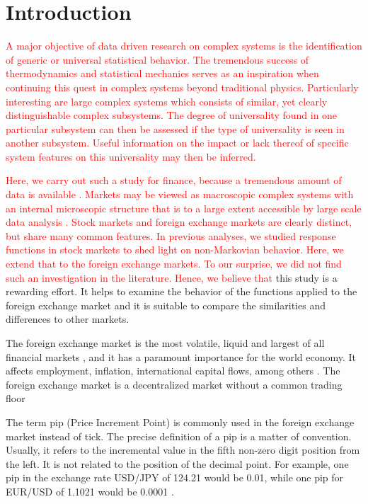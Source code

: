 \section{Introduction}\label{sec:introduction}

\textcolor{red}{
A major objective of data driven research on complex systems is the
identification of generic or universal statistical behavior. The tremendous
success of thermodynamics and statistical mechanics serves as an inspiration
when continuing this quest in complex systems beyond traditional physics.
Particularly interesting are large complex systems which consists of similar,
yet clearly distinguishable complex subsystems. The degree of universality
found in one particular subsystem can then be assessed if the type of
universality is seen in another subsystem. Useful information on the impact or
lack thereof of specific system features on this universality may then be
inferred.}

\textcolor{red}{
Here, we carry out such a study for finance, because a tremendous amount of
data is available \cite{physicists_contribution}. Markets may be viewed as
macroscopic complex systems with an internal microscopic structure that is to a
large extent accessible by large scale data analysis \cite{complex_markets}.
Stock markets and foreign exchange markets are clearly distinct, but share
many common features. In previous analyses, we studied response functions in
stock markets to shed light on non-Markovian behavior. Here, we extend that to
the foreign exchange markets. To our surprise, we did not find such an
investigation in the literature. Hence, we believe that}
this study is a rewarding effort. It helps to examine the behavior of the
functions applied to the foreign exchange market and it is suitable to compare
the similarities and differences to other markets.

The foreign exchange market is the most volatile, liquid and largest of all
financial markets
\cite{forex_liquidity,info_forex,forex_market_micro,intraday_forex}, and it has
a paramount importance for the world economy. It affects employment, inflation,
international capital flows, among others \cite{forex_structure}. The foreign
exchange market is a decentralized market without a common trading floor
\cite{info_forex,forex_market_micro,forex_structure,teach_spread}

The term pip (Price Increment Point) is commonly used in the foreign exchange
market instead of tick. The precise definition of a pip is a matter of
convention. Usually, it refers to the incremental value in the fifth non-zero
digit position from the left. It is not related to the position of the decimal
point. For example, one pip in the exchange rate USD/JPY of 124.21 would be
0.01, while one pip for EUR/USD of 1.1021 would be 0.0001
\cite{forex_market_micro,forex_structure,order_flow_forex,micro_eff}.

